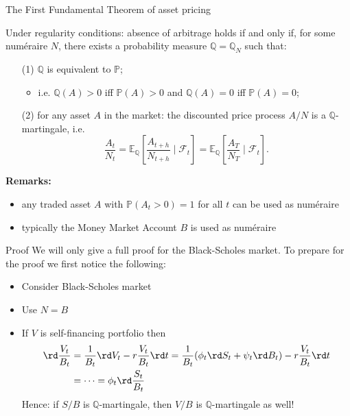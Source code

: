 \documentclass[pdf, handout]{beamer}
\renewcommand{\calF}{\mathcal{F}}
\begin{document}
%
\begin{frame}{The First Fundamental Theorem of asset pricing}
\begin{theorem} Under regularity conditions: 
absence of arbitrage holds if and only if,
for some num\'{e}raire $N$, there exists a probability measure $\mathbb{Q}=\mathbb{Q}_N$ such that:
\begin{itemize}
\item[(1)] $\mathbb{Q}$ is equivalent to $\mathbb{P}$;
\begin{itemize}
\item i.e. $\mathbb{Q}(A)>0$ iff $\mathbb{P}(A)>0$ and $\mathbb{Q}(A)=0$ iff $\mathbb{P}(A)=0$;
\end{itemize}
\item[(2)] for any asset $A$ in the market: the discounted price process $A/N$ is a $\mathbb{Q}$-martingale, i.e. 
\[
\frac{A_t}{N_t}=\mathbb{E}_{\mathbb{Q}}\left[ \frac{A_{t+h}}{N_{t+h}} \mid \calF_t \right] 
=
\mathbb{E}_{\mathbb{Q}}\left[ \frac{A_{T}}{N_{T}} \mid \calF_t \right].
\]
\end{itemize}
\end{theorem}
\textbf{Remarks:}
\begin{itemize}
\item any traded asset $A$ with $\mathbb{P}(A_t > 0)=1$ for all $t$ can be used as num\'{e}raire
\item typically the Money Market Account $B$ is used as num\'{e}raire 
\end{itemize}
%
\end{frame}
%
\begin{frame}{Proof}
We will only give a full proof for the Black-Scholes market. To prepare for the proof we first notice the following:
\begin{itemize}
\item Consider Black-Scholes market
\item Use $N=B$
\item If $V$ is self-financing portfolio then
\begin{align*}
\rd \frac{V_t}{B_t}
&= \frac{1}{B_t} \rd V_t - r \frac{V_t}{B_t}  
\rd t =
\frac{1}{B_t}(\phi_t \rd S_t + \psi_t \rd B_t)
 -r \frac{V_t}{B_t} \rd t \\
 & =\dots = \phi_t \rd \frac{S_t}{B_t}
\end{align*}
Hence: if $S/B$ is $\mathbb{Q}$-martingale, then
$V/B$ is $\mathbb{Q}$-martingale as well!
\end{itemize}
\end{frame}
\end{document}
